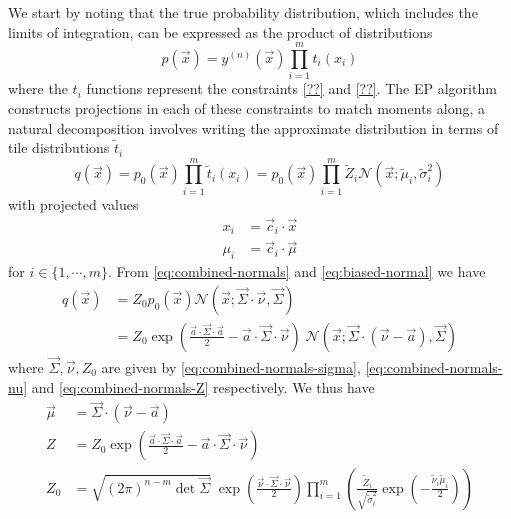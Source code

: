 \documentclass[11pt,twoside]{report}
\begin{document}
We start by noting that the true probability distribution, which includes the limits of integration, can be expressed as the product of distributions
\begin{equation}
  p(\vec{x})
  = y^{(n)}(\vec{x}) \prod_{i=1}^{m} t_i (x_i)
\end{equation}
where the $t_i$ functions represent the constraints \eqref{??} and \eqref{??}.
The EP algorithm constructs projections in each of these constraints to match moments along, a natural decomposition involves writing the approximate distribution in terms of tile distributions $\tilde{t}_i$
\begin{equation}
  q(\vec{x})
  = p_0(\vec{x}) \prod_{i=1}^{m} \tilde{t}_i (x_i)
  = p_0(\vec{x}) \prod_{i=1}^{m} \tilde{Z}_i \mathcal{N}(\vec{x}; \tilde{\mu}_i, \tilde{\sigma}_i^2)
\end{equation}
with projected values
\begin{subequations}
  \begin{align}
    x_i &= \vec{c}_i \cdot \vec{x} \\
    \mu_i &= \vec{c}_i \cdot \vec{\mu}
  \end{align}
\end{subequations}
for $i \in \{1,\cdots,m\}$.
From \eqref{eq:combined-normals} and \eqref{eq:biased-normal} we have
\begin{equation}
  \begin{split}
    q(\vec{x}) &=
    Z_0
    p_0(\vec{x})
    \mathcal{N}(\vec{x}; \vec{\Sigma} \cdot \vec{\nu}, \vec{\Sigma}) \\
    &=
    Z_0
    \exp{\left( \frac{\vec{a} \cdot \vec{\Sigma} \cdot \vec{a}}{2} - \vec{a} \cdot \vec{\Sigma} \cdot{\vec{\nu}} \right)} \;
    \mathcal{N}(\vec{x}; \vec{\Sigma} \cdot (\vec{\nu} - \vec{a}), \vec{\Sigma})
  \end{split}
\end{equation}
where $\vec{\Sigma}, \vec{\nu}, Z_0$ are given by \eqref{eq:combined-normals-sigma}, \eqref{eq:combined-normals-nu} and \eqref{eq:combined-normals-Z} respectively.
We thus have
\begin{subequations}
  \begin{align}
    \vec{\mu} &= \vec{\Sigma} \cdot (\vec{\nu} - \vec{a})
    \\
    Z &= Z_0
    \exp{\left( \frac{\vec{a} \cdot \vec{\Sigma} \cdot \vec{a}}{2} - \vec{a} \cdot \vec{\Sigma} \cdot \vec{\nu} \right)}
    \\
    Z_0 &=
    \sqrt{ (2\pi)^{n-m} \det{\vec{\Sigma}} }
    \;
    \exp{\left( \frac{\vec{\nu} \cdot \vec{\Sigma} \cdot \vec{\nu}}{2} \right)}
    \prod_{i=1}^m
    \left(
    \frac{\tilde{Z}_i}{\sqrt{ \tilde{\sigma}_i^2 }}
    \exp{\left(-\frac{\tilde{\nu}_i \tilde{\mu}_i}{2}\right)}
    \right)
  \end{align}
\end{subequations}
\end{document}
